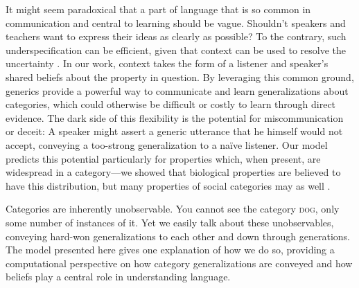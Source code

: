 \documentclass[10pt,letterpaper]{article}
\begin{document}
It might seem paradoxical that a part of language that is so common in communication and central to learning should be vague. 
Shouldn't speakers and teachers want to express their ideas as clearly as possible?
To the contrary, such underspecification can be efficient, given that context can be used to resolve the uncertainty \cite{Piantadosi2012}.
In our work, context takes the form of a listener and speaker's shared beliefs about the property in question. 
By leveraging this common ground, generics provide a powerful way to communicate and learn generalizations about categories, which could otherwise be difficult or costly to learn through direct evidence.
The dark side of this flexibility is the potential for miscommunication or deceit: A speaker might assert a generic utterance that he himself would not accept, conveying a too-strong generalization to a na\"{i}ve listener.  
Our model predicts this potential particularly for properties which, when present, are widespread in a category---we showed that biological properties are believed to have this distribution, but many properties of social categories may as well \cite{Cimpian2011a, Cimpian2012b, Rhodes2012}.


Categories are inherently unobservable. 
You cannot see the category \textsc{dog}, only some number of instances of it.
Yet we easily talk about these unobservables, conveying hard-won generalizations to each other and down through generations.
The model presented here gives one explanation of how we do so, providing a computational perspective on how category generalizations are conveyed and how beliefs play a central role in understanding language.



%




\setlength{\bibleftmargin}{.125in}
\setlength{\bibindent}{-\bibleftmargin}


\end{document}
